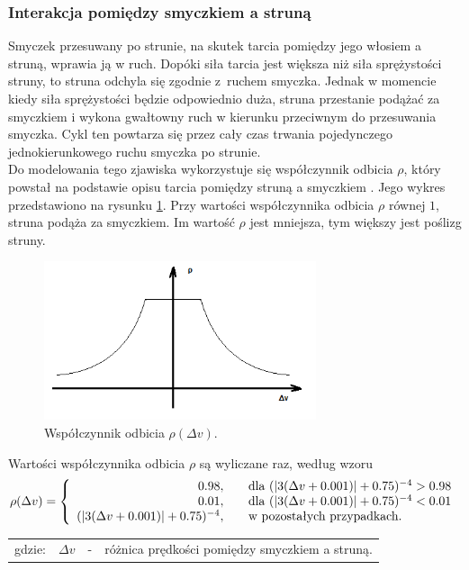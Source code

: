 \subsubsection{Interakcja pomiędzy smyczkiem a struną}
Smyczek przesuwany po strunie, na skutek tarcia pomiędzy jego włosiem a struną, wprawia ją w ruch. Dopóki siła tarcia jest większa niż siła sprężystości struny, to struna odchyla się zgodnie z~ruchem smyczka. Jednak w momencie kiedy siła sprężystości będzie odpowiednio duża, struna przestanie podążać za smyczkiem i wykona gwałtowny ruch w kierunku przeciwnym do przesuwania smyczka.  Cykl ten powtarza się przez cały czas trwania pojedynczego jednokierunkowego ruchu smyczka po strunie.  \\
Do modelowania tego zjawiska wykorzystuje się współczynnik odbicia $\rho$, który powstał na podstawie opisu tarcia pomiędzy struną a smyczkiem \cite{bowed_3}. Jego wykres przedstawiono na rysunku \ref{rys:tarcie}. Przy wartości współczynnika odbicia $\rho$ równej $1$, struna podąża za smyczkiem. Im wartość $\rho$ jest mniejsza, tym większy jest poślizg struny.
\begin{figure}[H]
	\centering
	\includegraphics[width=8cm]{grafiki/tarcie2}
	\captionsetup{justification=centering}
	\caption{Współczynnik odbicia $\rho(\Delta v)$.}
	\label{rys:tarcie}
\end{figure}
Wartości współczynnika odbicia $\rho$ są wyliczane raz, według wzoru
\begin{equation} \label{equ:model_wsp_odbicia}
\rho(\Delta v) = \left \{\begin{array}{ r l }
0.98, & \quad \text{dla } (|3 (\Delta v + 0.001) | + 0.75)^{-4} > 0.98\\
0.01, & \quad  \text{dla } (|3 (\Delta v + 0.001) | + 0.75)^{-4} < 0.01\\
(|3 (\Delta v + 0.001) | + 0.75)^{-4}, & \quad \text{w pozostałych przypadkach.}
\end{array}
\right.
\end{equation}
\begin{tabular}{ l l l l}
	gdzie: & $\Delta v$ &  - & różnica prędkości pomiędzy smyczkiem a struną.
\end{tabular} \\ \\
